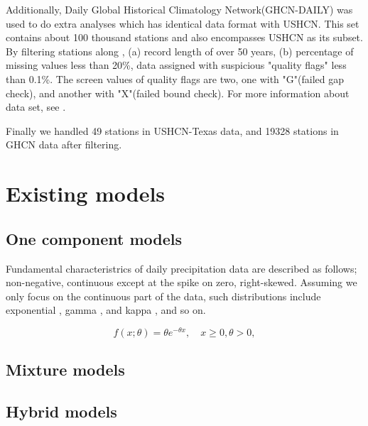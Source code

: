 \documentclass[12pt]{article}\usepackage[]{graphicx}\usepackage[]{color}
\begin{document}
Additionally, Daily Global Historical Climatology Network(GHCN-DAILY) was used to do extra analyses \cite{papalexiou2012entropy, papalexiou2013extreme} which has identical data format with USHCN. This set contains about 100 thousand stations and also encompasses USHCN as its subset. By filtering stations along \cite{papalexiou2013extreme}, (a) record length of over 50 years, (b) percentage of missing values less than 20\%, data assigned with suspicious "quality flags" less than 0.1\%. The screen values of quality flags are two, one with "G"(failed gap check), and another with "X"(failed bound check). For more information about data set, see \cite{menne2012overview}. 


Finally we handled 49 stations in USHCN-Texas data, and 19328 stations in GHCN data after filtering. 


\section{Existing models}

	\subsection{One component models}


Fundamental characteristrics of daily precipitation data are described as follows; non-negative, continuous except at the spike on zero, right-skewed. Assuming we only focus on the continuous part of the data, such distributions include exponential \cite{todorovic1975stochastic}, gamma \cite{ison1971wet, wilks1999interannual, schoof2010development}, and kappa \cite{mielke1973three}, and so on. 

\begin{equation}
\label{exponentail.pdf} 
f(x ; \theta) = \theta e^{-\theta x}, \quad x \geq 0, \theta > 0,
\end{equation}



	\subsection{Mixture models}


	\subsection{Hybrid models} 
\end{document}
